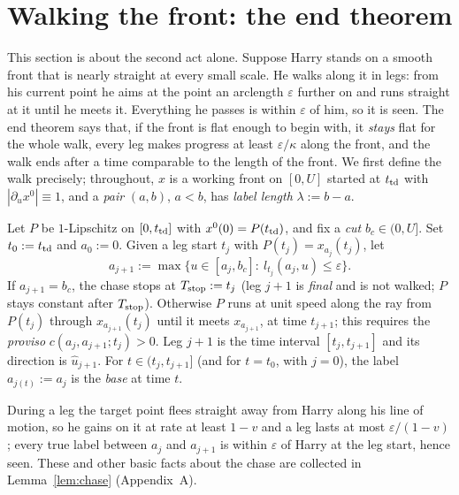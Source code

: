 \section{Walking the front: the end theorem}\label{sec:chase}

This section is about the second act alone. Suppose Harry stands on a smooth front that is nearly straight at every
small scale. He walks along it in legs: from his current point he aims at the point an arclength $\varepsilon$ further
on and runs straight at it until he meets it. Everything he passes is within $\varepsilon$ of him, so it is seen. The
end theorem says that, if the front is flat enough to begin with, it \emph{stays} flat for the whole walk, every leg
makes progress at least $\varepsilon/\kappa$ along the front, and the walk ends after a time comparable to the length
of the front. We first define the walk precisely; throughout, $x$ is a working front on $[0,U]$ started at $t_{\mathrm{td}}$
with $|\partial_ux^0|\equiv1$, and a \emph{pair} $(a,b)$, $a<b$, has \emph{label length} $\lambda:=b-a$.

\begin{definition}\label{def:chase}
Let $P$ be $1$-Lipschitz on $[0,t_{\mathrm{td}}]$ with $x^0(0)=P(t_{\mathrm{td}})$, and fix a \emph{cut} $b_c\in(0,U]$. Set
$t_0:=t_{\mathrm{td}}$ and $a_0:=0$. Given a leg start $t_j$ with $P(t_j)=x_{a_j}(t_j)$, let
\[
a_{j+1}:=\max\bigl\{u\in[a_j,b_c]:\ l_{t_j}(a_j,u)\le\varepsilon\bigr\}.
\]
If $a_{j+1}=b_c$, the chase stops at $T_{\mathrm{stop}}:=t_j$ (leg $j+1$ is \emph{final} and is not walked; $P$ stays constant
after $T_{\mathrm{stop}}$). Otherwise $P$ runs at unit speed along the ray from $P(t_j)$ through $x_{a_{j+1}}(t_j)$ until it
meets $x_{a_{j+1}}$, at time $t_{j+1}$; this requires the \emph{proviso} $c(a_j,a_{j+1};t_j)>0$. Leg $j+1$ is the time
interval $[t_j,t_{j+1}]$ and its direction is $\hat u_{j+1}$. For $t\in(t_j,t_{j+1}]$ (and for $t=t_0$, with $j=0$),
the label $a_{j(t)}:=a_j$ is the \emph{base} at time $t$.
\end{definition}

During a leg the target point flees straight away from Harry along his line of motion, so he gains on it at rate at
least $1-v$ and a leg lasts at most $\varepsilon/(1-v)$; every true label between $a_j$ and $a_{j+1}$ is within
$\varepsilon$ of Harry at the leg start, hence seen. These and other basic facts about the chase are collected in
Lemma~\ref{lem:chase} (Appendix~A).

